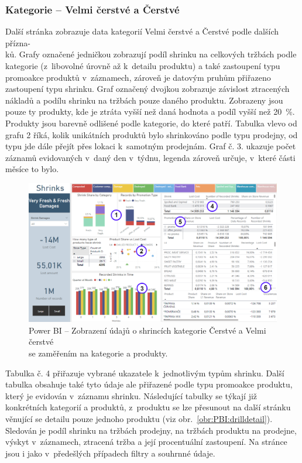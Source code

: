 \subsubsection*{Kategorie -- Velmi čerstvé a Čerstvé}

Další stránka zobrazuje data kategorií Velmi čerstvé a Čerstvé podle dalších přízna-\\ků. Grafy označené jedničkou zobrazují podíl shrinku na celkových tržbách podle kategorie (z~libovolné úrovně až k~detailu produktu) a také zastoupení typu promoakce produktů v~záznamech, zároveň je datovým pruhům přiřazeno zastoupení typu shrinku. Graf označený dvojkou zobrazuje závislost ztracených nákladů a podílu shrinku na tržbách pouze daného produktu. Zobrazeny jsou pouze ty produkty, kde je ztráta vyšší než daná hodnota a podíl vyšší než 20~\%. Produkty jsou barevně odlišené podle kategorie, do které patří. Tabulka vlevo od grafu 2 říká, kolik unikátních produktů bylo shrinkováno podle typu prodejny, od typu jde dále přejít přes lokaci k~samotným prodejnám. Graf č. 3. ukazuje počet záznamů evidovaných v~daný den v~týdnu, legenda zároveň určuje, v~které části měsíce to bylo. 

\begin{figure}[h!]
    \centering
    \captionsetup{justification=centering}
    \includegraphics[width=\textwidth]{obrazky/PBI/levelsSFFkopie.png}
    \caption{Power BI -- Zobrazení údajů o shrincích kategorie Čerstvé a Velmi čerstvé \\ se zaměřením na kategorie a produkty.}
    \label{obr:PBI:levelsSFF}
\end{figure}

Tabulka č. 4 přiřazuje vybrané ukazatele k~jednotlivým typům shrinku. Další tabulka obsahuje také tyto údaje ale přiřazené podle typu promoakce produktu, který je evidován v~záznamu shrinku. Následující tabulky se týkají již konkrétních kategorií a produktů, z~produktu se lze přesunout na další stránku věnující se detailu pouze jednoho produktu (viz obr.~\ref*{obr:PBI:drilldetail}). Sledován je podíl shrinku na tržbách prodejny, na tržbách produktu na prodejne, výskyt v~záznamech, ztracená tržba a její procentuální zastoupení. Na stránce jsou i jako v~předešlých případech filtry a souhrnné údaje.

